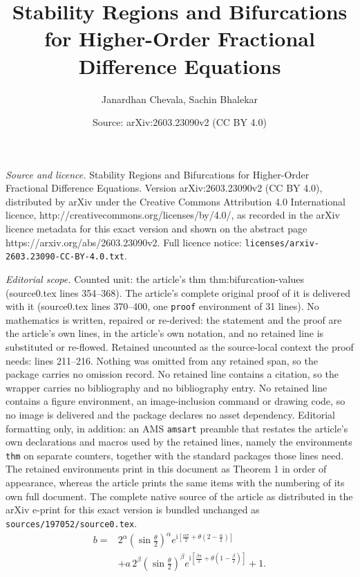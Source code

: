 \documentclass[10pt,a4paper]{amsart}
\title{Stability Regions and Bifurcations for Higher-Order Fractional Difference Equations}
\author{Janardhan Chevala, Sachin Bhalekar}
\date{Source: arXiv:2603.23090v2 (CC BY 4.0)}
\begin{document}
\maketitle

\noindent\emph{Source and licence.} Stability Regions and Bifurcations for Higher-Order Fractional Difference Equations. Version arXiv:2603.23090v2 (CC BY 4.0), distributed by arXiv under the Creative Commons Attribution 4.0 International licence, http://creativecommons.org/licenses/by/4.0/, as recorded in the arXiv licence metadata for this exact version and shown on the abstract page https://arxiv.org/abs/2603.23090v2. Full licence notice: \texttt{licenses/arxiv-2603.23090-CC-BY-4.0.txt}.\par\smallskip

\noindent\textit{Editorial scope.} Counted unit: the article's thm thm:bifurcation-values (source0.tex lines 354--368). The article's complete original proof of it is delivered with it (source0.tex lines 370--400, one \texttt{proof} environment of 31 lines). No mathematics is written, repaired or re-derived: the statement and the proof are the article's own lines, in the article's own notation, and no retained line is substituted or re-flowed.  Retained uncounted as the source-local context the proof needs: lines 211--216.  Nothing was omitted from any retained span, so the package carries no omission record.  No retained line contains a citation, so the wrapper carries no bibliography and no bibliography entry.  No retained line contains a figure environment, an image-inclusion command or drawing code, so no image is delivered and the package declares no asset dependency.  Editorial formatting only, in addition: an AMS \texttt{amsart} preamble that restates the article's own declarations and macros used by the retained lines, namely the environments \texttt{thm} on separate counters, together with the standard packages those lines need.  The retained environments print in this document as Theorem 1 in order of appearance, whereas the article prints the same items with the numbering of its own full document.  The complete native source of the article as distributed in the arXiv e-print for this exact version is bundled unchanged as \texttt{sources/197052/source0.tex}.
 \begin{align}
 b ={}& 2^\alpha\left(\sin\frac{\theta}{2}\right)^\alpha
 e^{\mathrm{i}\left[\frac{\alpha\pi}{2}+\theta\left(2-\frac{\alpha}{2}\right)\right]} \nonumber\\
 &+ a\,2^\beta\left(\sin\frac{\theta}{2}\right)^\beta
 e^{\mathrm{i}\left[\frac{\beta\pi}{2}+\theta\left(1-\frac{\beta}{2}\right)\right]} + 1. \label{simbval}
\end{align}
\end{document}
